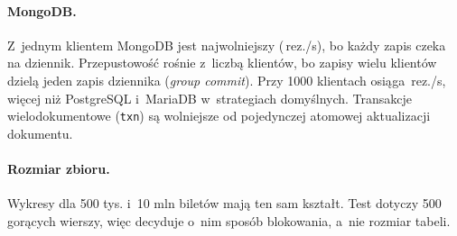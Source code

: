 \paragraph{MongoDB.} Z~jednym klientem MongoDB jest najwolniejszy
(\,rez./s), bo każdy zapis czeka na dziennik.
Przepustowość rośnie z~liczbą klientów, bo zapisy wielu klientów dzielą
jeden zapis dziennika (\emph{group commit}). Przy 1000 klientach osiąga
\,rez./s, więcej niż PostgreSQL
i~MariaDB w~strategiach domyślnych. Transakcje wielodokumentowe (\texttt{txn})
są wolniejsze od pojedynczej atomowej aktualizacji dokumentu.

\paragraph{Rozmiar zbioru.} Wykresy dla 500 tys. i~10 mln biletów mają ten
sam kształt. Test dotyczy 500 gorących wierszy, więc decyduje o~nim sposób
blokowania, a~nie rozmiar tabeli.
